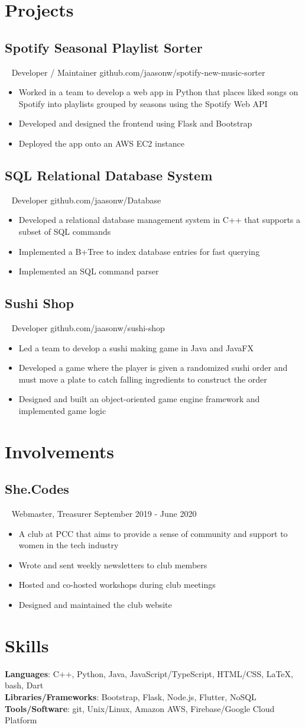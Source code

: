 \documentclass{article}
\newcommand{\resumesection}[3]{
    \subsection*{#1}
    \ 
    \footnotesize
    \textcolor{csufgrey}{#2}
    \footnotesize
    \hfill
    \textcolor{csufgrey}{#3}
    \normalsize
}
\begin{document}
\section*{Projects}
\resumesection{Spotify Seasonal Playlist Sorter}{Developer / Maintainer}{github.com/jaasonw/spotify-new-music-sorter}
\begin{itemize}
    \item Worked in a team to develop a web app in Python that places liked songs on Spotify into playlists grouped by seasons using the Spotify Web API
    \item Developed and designed the frontend using Flask and Bootstrap
    \item Deployed the app onto an AWS EC2 instance
\end{itemize}

\resumesection{SQL Relational Database System}{Developer}{github.com/jaasonw/Database}
\begin{itemize}
    \item Developed a relational database management system in C++ that supports a subset of SQL commands
    \item Implemented a B+Tree to index database entries for fast querying
    \item Implemented an SQL command parser
\end{itemize}

\resumesection{Sushi Shop}{Developer}{github.com/jaasonw/sushi-shop}
\begin{itemize}
    \item Led a team to develop a sushi making game in Java and JavaFX
    \item Developed a game where the player is given a randomized sushi order and must move a plate to catch falling ingredients to construct the order
    \item Designed and built an object-oriented game engine framework and implemented game logic
\end{itemize}
\hfill
\section*{Involvements}
\resumesection{She.Codes}{Webmaster, Treasurer}{September 2019 - June 2020}
\begin{itemize}
    \item A club at PCC that aims to provide a sense of community and support to women in the tech industry
    \item Wrote and sent weekly newsletters to club members
    \item Hosted and co-hosted workshops during club meetings
    \item Designed and maintained the club website
\end{itemize}
\hfill
\section*{Skills}
\textbf{Languages}: C++, Python, Java, JavaScript/TypeScript, HTML/CSS, {\selectfont\LaTeX}, bash, Dart\\
\textbf{Libraries/Frameworks}: Bootstrap, Flask, Node.js, Flutter, NoSQL\\
\textbf{Tools/Software}: git, Unix/Linux, Amazon AWS, Firebase/Google Cloud Platform
\end{document}
